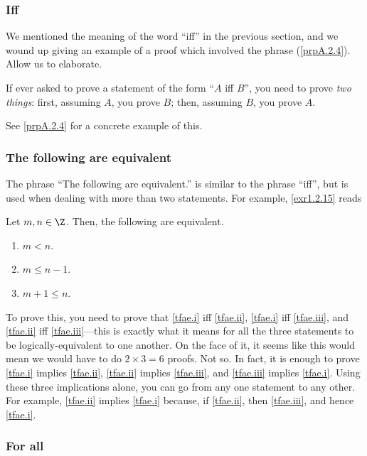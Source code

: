 \subsubsection{Iff}

We mentioned the meaning of the word ``iff'' in the previous section, and we wound up giving an example of a proof which involved the phrase (\cref{prpA.2.4}).  Allow us to elaborate.
\begin{important}
If ever asked to prove a statement of the form ``$A$ iff $B$'', you need to prove \emph{two things}:  first, assuming $A$, you prove $B$; then, assuming $B$, you prove $A$.
\end{important}
See \cref{prpA.2.4} for a concrete example of this.

\subsubsection{The following are equivalent}

The phrase ``The following are equivalent.'' is similar to the phrase ``iff'', but is used when dealing with more than two statements.  For example, \cref{exr1.2.15} reads
\begin{displayquote}
Let $m,n\in \Z$.  Then, the following are equivalent.
\begin{enumerate}
\item \label{tfae.i}$m<n$.
\item \label{tfae.ii}$m\leq n-1$.
\item \label{tfae.iii}$m+1\leq n$.
\end{enumerate}
\end{displayquote}
To prove this, you need to prove that \cref{tfae.i} iff \cref{tfae.ii}, \cref{tfae.i} iff \cref{tfae.iii}, and \cref{tfae.ii} iff \cref{tfae.iii}---this is exactly what it means for all the three statements to be logically-equivalent to one another.  On the face of it, it seems like this would mean we would have to do $2\times 3=6$ proofs.  Not so.  In fact, it is enough to prove \cref{tfae.i} implies \cref{tfae.ii}, \cref{tfae.ii} implies \cref{tfae.iii}, and \cref{tfae.iii} implies \cref{tfae.i}.  Using these three implications alone, you can go from any one statement to any other.  For example, \cref{tfae.ii} implies \cref{tfae.i} because, if \cref{tfae.ii}, then \cref{tfae.iii}, and hence \cref{tfae.i}.

\subsubsection{For all\textellipsis}

